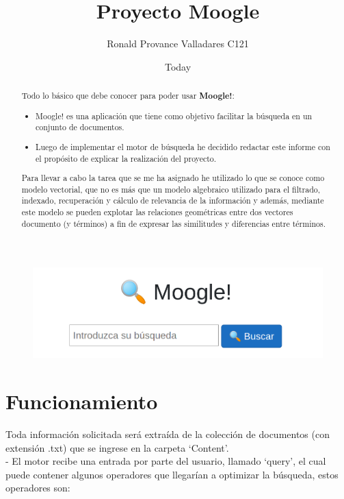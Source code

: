 \documentclass[a4paper,12pt]{article}
\title{Proyecto Moogle}
\author{Ronald Provance Valladares C121}
\date{Today}
\begin{document}
	\maketitle
\begin{figure}[h]
	\centering
	\includegraphics[width=17cm]{moogle.png}
\end{figure}


\begin{abstract}
	
	\begin{center}
		\large Todo lo básico que debe conocer para poder usar \textbf{Moogle!}:
	\end{center}

\begin{itemize}
	\item Moogle! es una aplicación que tiene como objetivo facilitar la búsqueda en un conjunto de documentos.

	\item Luego de implementar el motor de búsqueda he decidido redactar este informe con el propósito de explicar la realización del proyecto.
	
\end{itemize}
	Para llevar a cabo la tarea que se me ha asignado he utilizado lo que se conoce como modelo vectorial, que no es más que un modelo algebraico utilizado para el filtrado, indexado, recuperación y cálculo de relevancia de la información y además, mediante este modelo se pueden explotar las relaciones geométricas entre dos vectores documento (y términos) a fin de expresar las similitudes y diferencias entre términos.
\end{abstract}




\section{Funcionamiento}
Toda información solicitada será extraída de la colección de documentos (con extensión .txt) que se ingrese en la carpeta ‘Content’. \\
- El motor recibe una entrada por parte del usuario, llamado ‘query’, el cual puede contener algunos operadores que llegarían a optimizar la búsqueda, estos operadores son:\\
\end{document}
